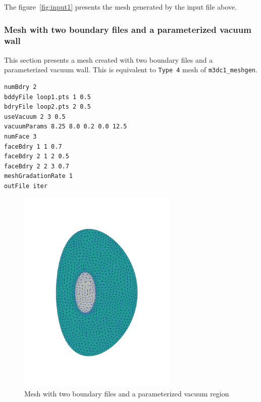The figure~\ref{fig:input1} presents the mesh generated by the input file above.

%
%
%
%


\subsubsection{Mesh with two boundary files and a parameterized vacuum wall}

This section presents a mesh created with two boundary files and a parameterized vacuum wall. This is equivalent to \texttt{Type 4} mesh of \texttt{m3dc1\_meshgen}.

\begin{verbatim}
numBdry 2
bddyFile loop1.pts 1 0.5
bdryFile loop2.pts 2 0.5
useVacuum 2 3 0.5
vacuumParams 8.25 8.0 0.2 0.0 12.5
numFace 3
faceBdry 1 1 0.7
faceBdry 2 1 2 0.5
faceBdry 2 2 3 0.7
meshGradationRate 1
outFile iter
\end{verbatim}

\begin{figure}
\centering
\includegraphics[width=3in]{./figures/meshgen-input2.pdf}
\caption{Mesh with two boundary files and a parameterized vacuum region}
\label{fig:input2}
\end{figure}

